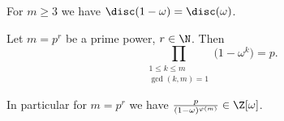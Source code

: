 
\begin{lem}
	For \( m \geq 3 \) we have \( \disc(1 - \omega) = \disc(\omega) \).
\end{lem}

\begin{lem}
	Let \( m = p^r \) be a prime power, \( r \in \N \).
	Then
	\[ \prod_{\substack{1 \leq k \leq m\\\gcd(k,m)=1}} \big(1-\omega^k\big) = p. \]
\end{lem}

\begin{rem*}
	In particular for \( m = p^r \) we have \( \frac{p}{(1-\omega)^{\varphi(m)}} \in \Z[\omega] \).
\end{rem*}